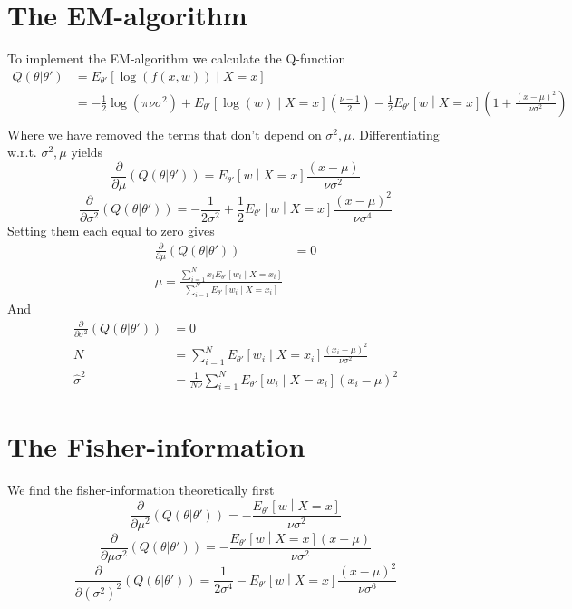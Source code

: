 \documentclass[a4paper, 11 pt]{article}
\begin{document}
\section{The EM-algorithm}
To implement the EM-algorithm we calculate the Q-function
\begin{align*}
    Q(\theta|\theta') &= E_{\theta'}\left[\log\left(f(x,w)\right) \middle| X = x \right] \\&= -\frac{1}{2}\log\left(\pi\nu\sigma^2\right) +  E_{\theta'}\left[ \log\left(w\right) \middle| X = x \right] \left(\frac{\nu-1}{2}\right) - \frac{1}{2}E_{\theta'}\left[ w \middle| X = x \right] \left(1+\frac{(x-\mu)^2}{\nu\sigma^2}\right)\\
\end{align*}
Where we have removed the terms that don't depend on $\sigma^2, \mu$. Differentiating w.r.t. $\sigma^2, \mu$ yields
\[
    \frac{\partial}{\partial \mu}\left(Q(\theta|\theta')\right) = E_{\theta'}\left[ w \middle| X = x \right]\frac{(x-\mu)}{\nu\sigma^2}
\]
\[
    \frac{\partial}{\partial \sigma^2}\left(Q(\theta|\theta')\right) = -\frac{1}{2\sigma^2} +\frac{1}{2}E_{\theta'}\left[ w \middle| X = x \right] \frac{(x-\mu)^2}{\nu\sigma^4}
\]
Setting them each equal to zero gives
\begin{align*}
    \frac{\partial}{\partial \mu}\left(Q(\theta|\theta')\right) &= 0 \\
    \hat{\mu} = \frac{\sum_{i = 1}^N x_i E_{\theta'}\left[ w_i \middle| X = x_i \right]}{\sum_{i = 1}^N E_{\theta'}\left[ w_i \middle| X = x_i \right]}
\end{align*}
And 
\begin{align*}
    \frac{\partial}{\partial \sigma^2}\left(Q(\theta|\theta')\right) &= 0 \\
    N &= \sum_{i = 1}^N E_{\theta'}\left[ w_i \middle| X = x_i \right] \frac{(x_i-\mu)^2}{\nu\sigma^2}\\
    \hat{\sigma}^2 &= \frac{1}{N\nu} \sum_{i = 1}^N  E_{\theta'}\left[ w_i \middle| X = x_i \right](x_i-\mu)^2 
\end{align*}
\section{The Fisher-information}
We find the fisher-information theoretically first
\[
    \frac{\partial}{\partial \mu^2}\left(Q(\theta|\theta')\right) = -\frac{E_{\theta'}\left[ w \middle| X = x \right]}{\nu\sigma^2} 
\]
\[
    \frac{\partial}{\partial \mu\sigma^2}\left(Q(\theta|\theta')\right) = -\frac{E_{\theta'}\left[ w \middle| X = x \right](x-\mu)}{\nu\sigma^2}
\]
\[
    \frac{\partial}{\partial (\sigma^2)^2}\left(Q(\theta|\theta')\right) = \frac{1}{2\sigma^4} - E_{\theta'}\left[ w \middle| X = x \right] \frac{(x-\mu)^2}{\nu \sigma^6}
\]
\end{document}

